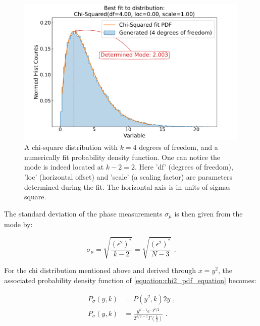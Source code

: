 \begin{figure}[!htb]
    \centering
    \includegraphics*[width=\textwidth]{Figures/Other_Studies/phase_chisquare_demo_fit.pdf}
    \caption{A chi-square distribution with \(k = 4\) degrees of freedom, and a numerically fit probability density function. One can notice the mode is indeed located at \(k - 2 = 2\). Here 'df' (degrees of freedom), 'loc' (horizontal offset) and 'scale' (a scaling factor) are parameters determined during the fit. The horizontal axis is in units of sigmas square.}
    \label{figure:chisquare_demo_fit}
\end{figure}

The standard deviation of the phase measurements \(\sigma_{\mu}\) is then given from the mode by:

\begin{equation}
    \sigma_{\mu} = \sqrt{\frac{(\epsilon^2)^*}{k - 2}} = \sqrt{\frac{(\epsilon^2)^*}{N - 3}} \text{ .}
    \label{equation:stdev_from_chi2_mode}
\end{equation}

For the chi distribution mentioned above and derived through \(x = y^2\), the associated probability density function of \cref{equation:chi2_pdf_equation} becomes:

\begin{equation}
    \begin{aligned}
        P_{\sigma}(y , k) &= P (y^2 , k) 2y \text{ ,} \\
        P_{\sigma}(y , k) &= \frac{y^{k-1} e^{-y^2/2}} {2^{k/2-1} \Gamma(\frac{k}{2})} \text{ .}
    \end{aligned}
    \label{equation:chi_pdf}  
\end{equation}

